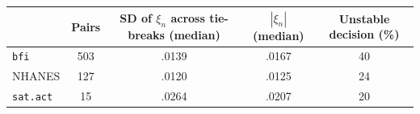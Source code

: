 \begin{tabular}{lcccc}
\toprule
 & Pairs & SD of $\xi_n$ across tie-breaks (median) & $|\xi_n|$ (median) & Unstable decision (\%) \\
\midrule
\texttt{bfi} & 503 & .0139 & .0167 & 40 \\
NHANES & 127 & .0120 & .0125 & 24 \\
\texttt{sat.act} & 15 & .0264 & .0207 & 20 \\
\bottomrule
\end{tabular}
